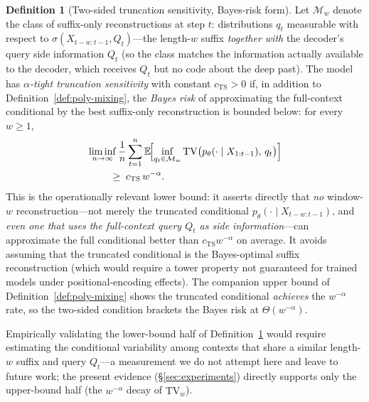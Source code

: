 \documentclass[11pt]{article}
\newcommand{\E}{\mathbb{E}}
\newcommand{\TV}{\mathrm{TV}}
\theoremstyle{plain}
\theoremstyle{definition}
\newtheorem{definition}[theorem]{Definition}
\theoremstyle{remark}
\begin{document}
\begin{definition}[Two-sided truncation sensitivity, Bayes-risk form]
\label{def:two-sided}
Let $\mathcal{M}_w$ denote the class of suffix-only reconstructions
at step $t$: distributions $q_t$ measurable with respect to
$\sigma(X_{t-w:t-1}, Q_t)$---the length-$w$ suffix \emph{together
with} the decoder's query side information $Q_t$ (so the class
matches the information actually available to the decoder, which
receives $Q_t$ but no code about the deep past). The model has
\emph{$\alpha$-tight truncation
sensitivity} with constant $c_{\mathrm{TS}} > 0$ if, in addition to
Definition~\ref{def:poly-mixing}, the
\emph{Bayes risk} of approximating the full-context conditional by
the best suffix-only reconstruction is bounded below: for every
$w \geq 1$,
\[
\begin{split}
&\liminf_{n \to \infty} \frac{1}{n}\sum_{t=1}^n
\E\!\Bigl[\inf_{q_t \in \mathcal{M}_w}
   \TV\bigl(p_\theta(\cdot \mid X_{1:t-1}),\, q_t\bigr)\Bigr]\\
&\qquad\;\geq\; c_{\mathrm{TS}}\, w^{-\alpha}.
\end{split}
\]
This is the operationally relevant lower bound: it asserts directly
that \emph{no} window-$w$ reconstruction---not merely the truncated
conditional $p_\theta(\cdot \mid X_{t-w:t-1})$, and \emph{even one
that uses the full-context query $Q_t$ as side information}---can
approximate the full conditional better than $c_{\mathrm{TS}}
w^{-\alpha}$ on average. It avoids assuming that the truncated conditional is the
Bayes-optimal suffix reconstruction (which would require a tower
property not guaranteed for trained models under positional-encoding
effects). The companion upper bound of
Definition~\ref{def:poly-mixing} shows the truncated conditional
\emph{achieves} the $w^{-\alpha}$ rate, so the two-sided condition
brackets the Bayes risk at $\Theta(w^{-\alpha})$.
\end{definition}

Empirically validating the lower-bound half of
Definition~\ref{def:two-sided} would require estimating the
conditional variability among contexts that share a similar
length-$w$ suffix and query $Q_t$---a measurement we do not attempt
here and leave to
future work; the present evidence (\S\ref{sec:experiments}) directly
supports only the upper-bound half (the $w^{-\alpha}$ decay of
$\widehat{\TV}_w$).
\end{document}
